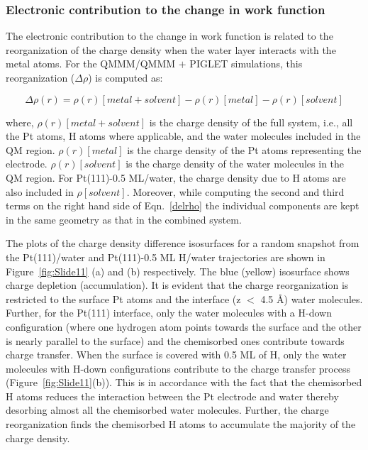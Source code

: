 
\subsubsection*{Electronic contribution to the change in work function}
\label{wf_ele}
The electronic contribution to the change in work function is related to the reorganization of the charge density when the water layer interacts with the metal atoms. For the QMMM/QMMM $+$ PIGLET simulations, this reorganization ($\Delta\rho$) is computed as:

\begin{equation}
\Delta\rho(r) = \rho (r)[metal+ solvent] - \rho (r)[metal] - \rho (r)[solvent]
\label{delrho}
\end{equation}

\noindent where, $\rho (r)[metal+solvent]$ is the charge density of
the full system, i.e., all the Pt atoms, H atoms where applicable, and 
the water molecules
included in the QM region. $\rho (r)[metal]$ is the charge density of
the Pt atoms representing the electrode. $\rho (r)[solvent]$ is the 
charge density of the water molecules in the QM region. 
For Pt(111)-0.5 ML/water, the charge density due to H atoms are also included in $\rho [solvent]$. Moreover, while computing
the second and third terms on the right hand side of Eqn.~\ref{delrho}
the individual components are kept in
the same geometry as that in the combined system.

The plots of the charge density difference isosurfaces for a random snapshot
from the Pt(111)/water and Pt(111)-0.5 ML H/water trajectories are shown 
in Figure~\ref{fig:Slide11} (a) and (b) respectively. The blue (yellow)
isosurface shows charge depletion (accumulation). It is evident that the 
charge reorganization is restricted to the surface Pt atoms and the 
interface (z $<$ 4.5 \AA{}) water molecules. Further, for the Pt(111)
interface, only the water molecules with a H-down configuration (where 
one hydrogen atom points towards the surface and the other is nearly 
parallel to the surface) and the chemisorbed ones contribute towards
charge transfer. When the surface is covered with 0.5 ML of H, only the water molecules with H-down configurations contribute to the charge transfer process (Figure~\ref{fig:Slide11}(b)). This is in accordance with the fact that the chemisorbed H atoms reduces the interaction between the Pt electrode and water thereby desorbing almost all the chemisorbed water molecules. Further, the charge reorganization finds the chemisorbed H atoms to accumulate the majority of the charge density. 

